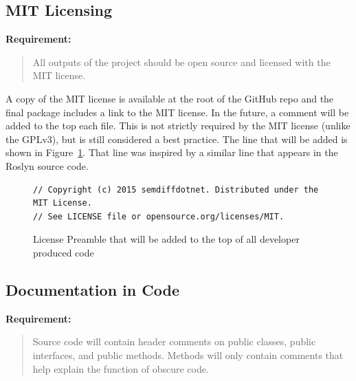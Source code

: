 \documentclass[draftclsnofoot,onecolumn]{IEEEtran}
\begin{document}
\subsection{MIT Licensing}%

\textbf{Requirement:}

\begin{quote}

All outputs of the project should be open source and licensed with the MIT 
license.

\end{quote}

A copy of the MIT license is available at the root of the GitHub repo and the 
final package includes a link to the MIT license. In the future, a comment 
will be added to the top each file. This is not strictly required by the MIT 
license (unlike the GPLv3), but is still considered a best practice. The line 
that will be added is shown in Figure~\ref{mitheader}. That line was inspired 
by a similar line that appears in the Roslyn source code.

\begin{figure}[!htb]
\centering
\begin{lstlisting}
// Copyright (c) 2015 semdiffdotnet. Distributed under the MIT License. 
// See LICENSE file or opensource.org/licenses/MIT.
\end{lstlisting}
\caption{License Preamble that will be added to the top of all developer 
produced code}
\label{mitheader}
\end{figure}

\subsection{Documentation in Code}%

\textbf{Requirement:}

\begin{quote}

Source code will contain header comments on public classes, public 
interfaces, and public methods. Methods will only contain comments that help 
explain the function of obscure code.

\end{quote}
\end{document}
